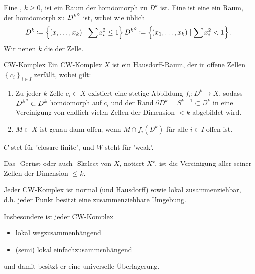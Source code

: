 

\begin{definition}[$k$-Zelle]\label{def:k-zelle}
    Eine ,  $k\geq 0$, ist ein Raum der homöomorph zu $D^k$ ist. Eine  ist eine ein Raum, der homöomorph zu ${D^k}^\circ$  ist, wobei wie üblich
    \[
        D^k \coloneqq  \left \{(x,\ldots,x_k) \mid  \sum x_i ^2 \leq  1\right\} \\
        {D^k}^\circ \coloneqq  \left \{(x_1,\ldots,x_k) \mid  \sum x_i^2 < 1\right\} 
    .\] 
    Wir nenen $k$ die   der Zelle. 
\end{definition}

\begin{definition}{CW-Komplex}\label{def:cw-komplex}
    Ein CW-Komplex  $X$ ist ein Hausdorff-Raum, der in offene Zellen  $\left \{c_i\right\} _{i \in I}$ zerfällt, wobei gilt:
    \begin{enumerate}[1.]
        \item Zu jeder $k$-Zelle  $c_i \subset X$ existiert eine stetige Abbildung $f_i \colon  D^k \to  X$, sodass ${D^k}^\circ \subset D^k$ homöomorph auf $c_i$ und der Rand  $\partial D^k = S^{k-1} \subset D^k$ in eine Vereinigung von endlich vielen Zellen der Dimension $<k$ abgebildet wird. 
        \item $M\subset X$ ist genau dann offen, wenn $M \cap f_i(D^k)$ für alle $i\in I$ offen ist.
    \end{enumerate}
\end{definition}

\begin{oral}
    $C$ stet für 'closure finite', und  $W$ steht für 'weak'.
\end{oral}

\begin{dnotation}
    Das -Gerüst oder auch -Skeleet von $X$, notiert  $X^k$, ist die Vereinigung aller seiner Zellen der Dimension  $\leq k$.  
\end{dnotation}

\begin{remark}
    Jeder CW-Komplex ist normal (und Hausdorff) sowie lokal zusammenziehbar, d.h. jeder Punkt besitzt eine zusammenziehbare Umgebung.

    Insbesondere ist jeder CW-Komplex
    \begin{itemize}
        \item lokal wegzusammenhängend
        \item (semi) lokal einfachzusammenhängend
    \end{itemize}
    und damit besitzt er eine universelle Überlagerung.
\end{remark}


